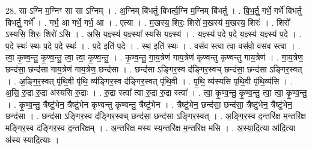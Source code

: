 \documentclass[17pt]{extarticle}
\begin{document}
28. सा ऽग्नि म॒ग्निꣳ सा सा ऽग्निम् । . अ॒ग्निम् बि॑भर्तु बिभर्त्व॒ग्नि म॒ग्निम् बि॑भर्तु । . बि॒भ॒र्तु॒ गर्भे॒ गर्भे॑ बिभर्तु बिभर्तु॒ गर्भे᳚ । . गर्भ॒ आ गर्भे॒ गर्भ॒ आ । . एत्या । . म॒खस्य॒ शिरः॒ शिरो॑ म॒खस्य॑ म॒खस्य॒ शिरः॑ । . शिरो᳚ ऽस्यसि॒ शिरः॒ शिरो॑ ऽसि । . अ॒सि॒ य॒ज्ञ्स्य॑ य॒ज्ञ्स्या᳚ स्यसि य॒ज्ञ्स्य॑ । . य॒ज्ञ्स्य॑ प॒दे प॒दे य॒ज्ञ्स्य॑ य॒ज्ञ्स्य॑ प॒दे । . प॒दे स्थः॑ स्थः प॒दे प॒दे स्थः॑ । . प॒दे इति॑ प॒दे । . स्थ॒ इति॑ स्थः । . वस॑व स्त्वा त्वा॒ वस॑वो॒ वस॑व स्त्वा । . त्वा॒ कृ॒ण्व॒न्तु॒ कृ॒ण्व॒न्तु॒ त्वा॒ त्वा॒ कृ॒ण्व॒न्तु॒ । . कृ॒ण्व॒न्तु॒ गा॒य॒त्रेण॑ गाय॒त्रेण॑ कृण्वन्तु कृण्वन्तु गाय॒त्रेण॑ । . गा॒य॒त्रेण॒ छन्द॑सा॒ छन्द॑सा गाय॒त्रेण॑ गाय॒त्रेण॒ छन्द॑सा । . छन्द॑सा ऽङ्गिर॒स्व द॑ङ्गिर॒स्वच् छन्द॑सा॒ छन्द॑सा ऽङ्गिर॒स्वत् । . अ॒ङ्गि॒र॒स्वत् पृ॑थि॒वी पृ॑थि॒ व्य॑ङ्गिर॒स्व द॑ङ्गिर॒स्वत् पृ॑थि॒वी । . पृ॒थि॒ व्य॑स्यसि पृथि॒वी पृ॑थि॒व्य॑सि । . अ॒सि॒ रु॒द्रा रु॒द्रा अ॑स्यसि रु॒द्राः । . रु॒द्रा स्त्वा᳚ त्वा रु॒द्रा रु॒द्रा स्त्वा᳚ । . त्वा॒ कृ॒ण्व॒न्तु॒ कृ॒ण्व॒न्तु॒ त्वा॒ त्वा॒ कृ॒ण्व॒न्तु॒ । . कृ॒ण्व॒न्तु॒ त्रैष्टु॑भेन॒ त्रैष्टु॑भेन कृण्वन्तु कृण्वन्तु॒ त्रैष्टु॑भेन । . त्रैष्टु॑भेन॒ छन्द॑सा॒ छन्द॑सा॒ त्रैष्टु॑भेन॒ त्रैष्टु॑भेन॒ छन्द॑सा । . छन्द॑सा ऽङ्गिर॒स्व द॑ङ्गिर॒स्वच् छन्द॑सा॒ छन्द॑सा ऽङ्गिर॒स्वत् । . अ॒ङ्गि॒र॒स्व द॒न्तरि॑क्ष म॒न्तरि॑क्ष मङ्गिर॒स्व द॑ङ्गिर॒स्व द॒न्तरि॑क्षम् । . अ॒न्तरि॑क्ष मस्य स्य॒न्तरि॑क्ष म॒न्तरि॑क्ष मसि । . अ॒स्या॒दि॒त्या आ॑दि॒त्या अ॑स्य स्यादि॒त्याः । \newline
\end{document}
